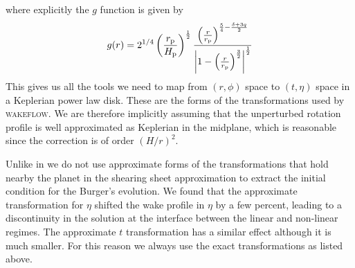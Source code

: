 where explicitly the $g$ function is given by \citep{bollati2021}
\begin{align}
    g(r) = 2^{1/4} \left( \frac{r_{\rm p}}{H_{\rm p}} \right)^{\frac{1}{2}} \frac{\left( \frac{r}{r_{\rm p}} \right)^{\frac{5}{4} - \frac{\delta + 3q}{2}}}{\left| 1 - \left(\frac{r}{r_{\rm p}}\right)^\frac{3}{2} \right|^\frac{1}{2}}
\end{align}
This gives us all the tools we need to map from $(r,\phi)$ space to $(t,\eta)$ space in a Keplerian power law disk.
These are the forms of the transformations used by \textsc{wakeflow}.
We are therefore implicitly assuming that the unperturbed rotation profile is well approximated as Keplerian in the midplane, which is reasonable since the correction is of order $\left(H/r\right)^2$.

Unlike in \citet{goodman2001,rafikov2002a,bollati2021} we do not use approximate forms of the transformations that hold nearby the planet in the shearing sheet approximation to extract the initial condition for the Burger's evolution.
We found that the approximate transformation for $\eta$ \citep[equations 35 in][]{rafikov2002a} shifted the wake profile in $\eta$ by a few percent, leading to a discontinuity in the solution at the interface between the linear and non-linear regimes.
The approximate $t$ transformation has a similar effect although it is much smaller.
For this reason we always use the exact transformations as listed above.

